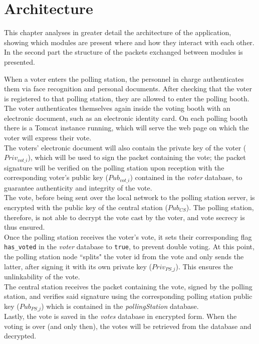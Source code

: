%
\chapter{Architecture}\label{ch:architecture}
This chapter analyses in greater detail the architecture of the application, showing which modules are present where and how they interact with each other. In the second part the structure of the packets exchanged between modules is presented.
\hfill \break


When a voter enters the polling station, the personnel in charge authenticates them via face recognition and personal documents. After checking that the voter is registered to that polling station, they are allowed to enter the polling booth.\\ The voter authenticates themselves again inside the voting booth with an electronic document, such as an electronic identity card. On each polling booth there is a Tomcat instance running, which will serve the web page on which the voter will express their vote.\\
The voters' electronic document will also contain the private key of the voter ($Priv_{vot\_i}$), which will be used to sign the packet containing the vote; the packet signature will be verified on the polling station upon reception with the corresponding voter's public key ($Pub_{vot\_i}$) contained in the \textit{voter} database, to guarantee authenticity and integrity of the vote.\\
The vote, before being sent over the local network to the polling station server, is encrypted with the public key of the central station ($Pub_{CS}$). The polling station, therefore, is not able to decrypt the vote cast by the voter, and vote secrecy is thus ensured.\\
Once the polling station receives the voter's vote, it sets their corresponding flag \texttt{has\_voted} in the \textit{voter} database to \texttt{true}, to prevent double voting. At this point, the polling station node ``splits" the voter id from the vote and only sends the latter, after signing it with its own private key ($Priv_{PS\_j}$). This ensures the unlinkability of the vote.\\
The central station receives the packet containing the vote, signed by the polling station, and verifies said signature using the corresponding polling station public key ($Pub_{PS\_j}$) which is contained in the \textit{pollingStation} database.\\
Lastly, the vote is saved in the \textit{votes} database in encrypted form. When the voting is over (and only then), the votes will be retrieved from the database and decrypted.

